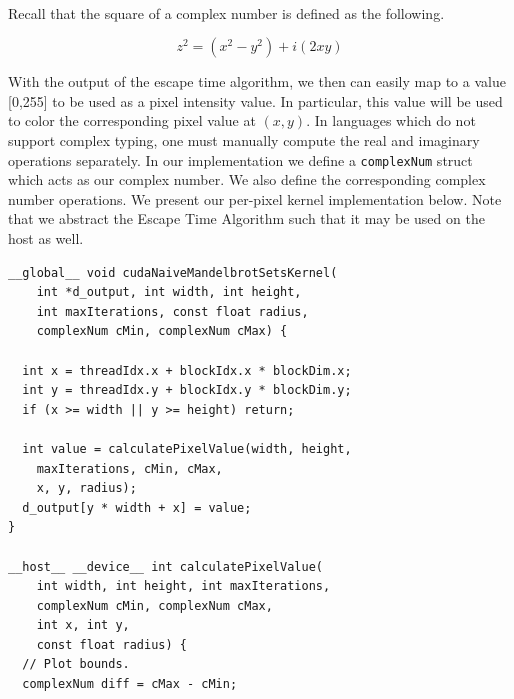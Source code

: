 \documentclass[letterpaper]{article}
\begin{document}
\begin{multicols}{2}
\noindent{} \\

Recall that the square of a complex number is defined as the following.

$$z^2=(x^2-y^2) + i(2xy)$$

With the output of the escape time algorithm, we then can easily map to a value
  [0,255] to be used as a pixel intensity value. In particular, this value will
  be used to color the corresponding pixel value at $(x, y)$. In languages 
  which do not support complex typing, one must manually compute the real and 
  imaginary operations separately. In our implementation we define a 
  \texttt{complexNum} struct which acts as our complex number. We also define 
  the corresponding complex number operations.
We present our per-pixel kernel implementation below. Note that we abstract the
  Escape Time Algorithm such that it may be used on the host as well.

\begin{lstlisting}
__global__ void cudaNaiveMandelbrotSetsKernel(
    int *d_output, int width, int height, 
    int maxIterations, const float radius, 
    complexNum cMin, complexNum cMax) {

  int x = threadIdx.x + blockIdx.x * blockDim.x;
  int y = threadIdx.y + blockIdx.y * blockDim.y;
  if (x >= width || y >= height) return;

  int value = calculatePixelValue(width, height, 
    maxIterations, cMin, cMax, 
    x, y, radius);
  d_output[y * width + x] = value;
}

__host__ __device__ int calculatePixelValue(
    int width, int height, int maxIterations,
    complexNum cMin, complexNum cMax, 
    int x, int y,  
    const float radius) {
  // Plot bounds. 
  complexNum diff = cMax - cMin;


\end{lstlisting}
\end{multicols}
\end{document}
